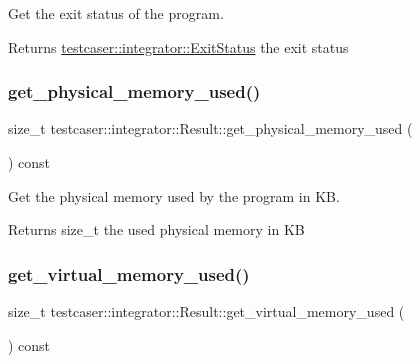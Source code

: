 Get the exit status of the program. 

\begin{DoxyReturn}{Returns}
\mbox{\hyperlink{namespacetestcaser_1_1integrator_a68fcfdfd3f063954e9fd1a94f4b4f755}{testcaser\+::integrator\+::\+Exit\+Status}} the exit status 
\end{DoxyReturn}
\mbox{\label{classtestcaser_1_1integrator_1_1Result_a7512baef0e0dc77c8543972917852dfa}} 
\subsubsection{\texorpdfstring{get\_physical\_memory\_used()}{get\_physical\_memory\_used()}}
{\footnotesize\ttfamily size\+\_\+t testcaser\+::integrator\+::\+Result\+::get\+\_\+physical\+\_\+memory\+\_\+used (\begin{DoxyParamCaption}{ }\end{DoxyParamCaption}) const\hspace{0.3cm}{\ttfamily [inline]}}



Get the physical memory used by the program in KB. 

\begin{DoxyReturn}{Returns}
size\+\_\+t the used physical memory in KB 
\end{DoxyReturn}
\mbox{\label{classtestcaser_1_1integrator_1_1Result_a72b4929256f610e35f244412bb14b38d}} 
\subsubsection{\texorpdfstring{get\_virtual\_memory\_used()}{get\_virtual\_memory\_used()}}
{\footnotesize\ttfamily size\+\_\+t testcaser\+::integrator\+::\+Result\+::get\+\_\+virtual\+\_\+memory\+\_\+used (\begin{DoxyParamCaption}{ }\end{DoxyParamCaption}) const\hspace{0.3cm}{\ttfamily [inline]}}



